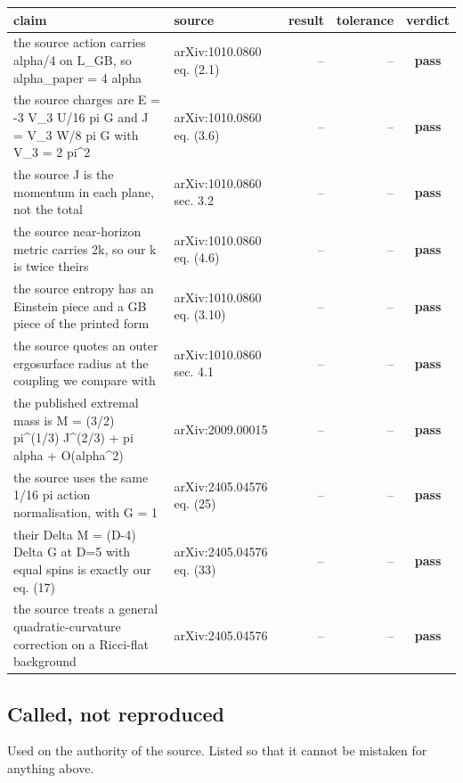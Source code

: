 \documentclass[11pt,a4paper]{article}
\newcommand{\PASS}{\textcolor{pass}{\textbf{pass}}}
\begin{document}
\begin{longtable}{@{}L{.38\textwidth}L{.24\textwidth}rrc@{}}
\toprule
claim & source & result & tolerance & verdict \\
\midrule\endhead
the source action carries alpha/4 on L\_GB, so alpha\_paper = 4 alpha & arXiv:1010.0860 eq. (2.1) & -- & -- & \PASS \\
the source charges are E = -3 V\_3 U/16 pi G and J = V\_3 W/8 pi G with V\_3 = 2 pi\textasciicircum{}2 & arXiv:1010.0860 eq. (3.6) & -- & -- & \PASS \\
the source J is the momentum in each plane, not the total & arXiv:1010.0860 sec. 3.2 & -- & -- & \PASS \\
the source near-horizon metric carries 2k, so our k is twice theirs & arXiv:1010.0860 eq. (4.6) & -- & -- & \PASS \\
the source entropy has an Einstein piece and a GB piece of the printed form & arXiv:1010.0860 eq. (3.10) & -- & -- & \PASS \\
the source quotes an outer ergosurface radius at the coupling we compare with & arXiv:1010.0860 sec. 4.1 & -- & -- & \PASS \\
the published extremal mass is M = (3/2) pi\textasciicircum{}(1/3) J\textasciicircum{}(2/3) + pi alpha + O(alpha\textasciicircum{}2) & arXiv:2009.00015 & -- & -- & \PASS \\
the source uses the same 1/16 pi action normalisation, with G = 1 & arXiv:2405.04576 eq. (25) & -- & -- & \PASS \\
their Delta M = (D-4) Delta G at D=5 with equal spins is exactly our eq. (17) & arXiv:2405.04576 eq. (33) & -- & -- & \PASS \\
the source treats a general quadratic-curvature correction on a Ricci-flat background & arXiv:2405.04576 & -- & -- & \PASS \\
\bottomrule
\end{longtable}

\subsection*{Called, not reproduced}
Used on the authority of the source. Listed so that it cannot be mistaken for anything above.
\end{document}
